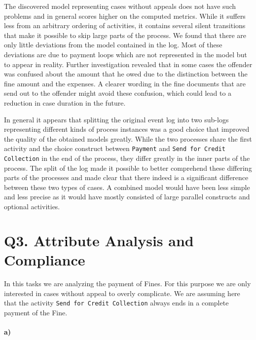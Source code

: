 \documentclass[12pt]{report}
\begin{document}
The discovered model representing cases without appeals does not have such problems and in general scores higher on the computed metrics. While it suffers less from an arbitrary ordering of activities, it contains several silent transitions that make it possible to skip large parts of the process. We found that there are only little deviations from the model contained in the log. Most of these deviations are due to payment loops which are not represented in the model but to appear in reality. Further investigation revealed that in some cases the offender was confused about the amount that he owed due to the distinction between the fine amount and the expenses. A clearer wording in the fine documents that are send out to the offender might avoid these confusion, which could lead to a reduction in case duration in the future.

In general it appears that splitting the original event log into two sub-logs representing different kinds of process instances was a good choice that improved the quality of the obtained models greatly. While the two processes share the first activity and the choice construct between \texttt{Payment} and \texttt{Send for Credit Collection} in the end of the process, they differ greatly in the inner parts of the process. The split of the log made it possible to better comprehend these differing parts of the processes and made clear that there indeed is a significant difference between these two types of cases. A combined model would have been less simple and less precise as it would have mostly consisted of large parallel constructs and optional activities.

\section{Q3. Attribute Analysis and Compliance}

In this tasks we are analyzing the payment of Fines. For this purpose we are only interested in cases without appeal to overly complicate. We are assuming here that the activity \texttt{Send for Credit Collection} always ends in a complete payment of the Fine.

\paragraph{\textbf{a)}}
\end{document}
